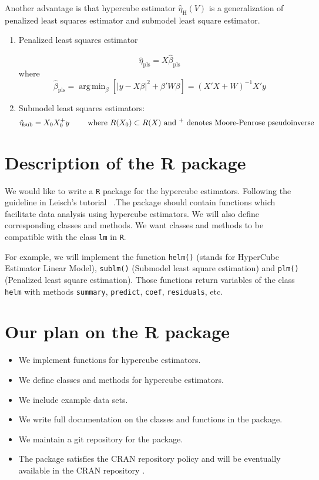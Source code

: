 \documentclass[draft]{article}
\DeclareMathOperator*{\argmin}{arg\,min}
\begin{document}
Another advantage is that hypercube estimator $\hat{\eta}_\text{H} (V)$ is a generalization of penalized least squares estimator and submodel least square estimator.

\begin{enumerate}
	\item Penalized least squares estimator

	$$
		\hat{\eta}_\text{pls} = X \hat{\beta}_\text{pls}
	$$
	where 
	$$
		\hat{\beta}_\text{pls} = \argmin_{\beta} [ | y - X\beta |^2 + \beta' W \beta ] = (X'X + W)^{-1} X' y 
	$$
	\item Submodel least squares estimators:
	$$
		\hat{\eta}_\text{sub} = X_0 X_0^+ y \qquad \text{ where $R(X_0) \subset R(X)$ and \textsuperscript{+} denotes Moore-Penrose pseudoinverse}
	$$
\end{enumerate}

\section{Description of the R package}

We would like to write a {\tt R} package for the hypercube estimators. Following the guideline in Leisch's tutorial~\cite{leisch2008creating} .The package should contain functions which facilitate data analysis using hypercube estimators. We will also define corresponding classes and methods. We want classes and methods to be compatible with the class {\tt lm} in {\tt R}.

For example, we will implement the function \texttt{helm()} (stands for HyperCube Estimator Linear Model), \texttt{sublm()} (Submodel least square estimation) and \texttt{plm()} (Penalized least square estimation). Those functions return variables of the class {\tt helm} with methods {\tt summary}, {\tt predict}, {\tt coef}, {\tt residuals}, etc.

\section{Our plan on the R package}

\begin{itemize}

	\item We implement functions for hypercube estimators.

	\item We define classes and methods for hypercube estimators.

	\item We include example data sets.

	\item We write full documentation on the classes and functions in the package.

	\item We maintain a git repository for the package.

	\item The package satisfies the CRAN repository policy and will be eventually available in the CRAN repository .

\end{itemize}
\end{document}
